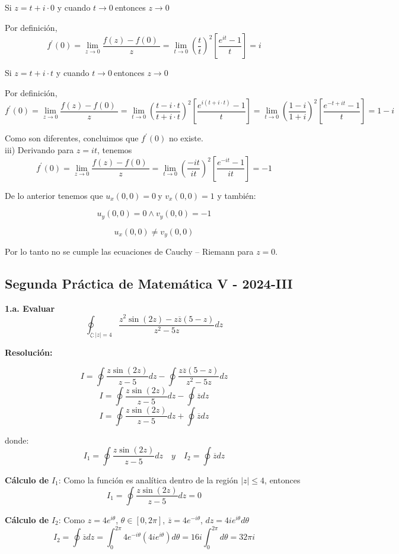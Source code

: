 \documentclass[a4paper,12pt]{article}
\begin{document}
Si $z = t + i \cdot 0$ y cuando $t \rightarrow 0\ $entonces
$z \rightarrow 0$

Por definición,
\[
f^{'}(0) = \lim_{z \rightarrow 0}\frac{f(z) - f(0)\ }{z} = \lim_{t \rightarrow 0}{\left( \frac{t}{t} \right)^{2}\left\lbrack \frac{e^{it} - 1}{t} \right\rbrack} = i
\]

Si $z = t + i \cdot t$ y cuando $t \rightarrow 0\ $entonces
$z \rightarrow 0$

Por definición,
\[
f^{'}(0) = \lim_{z \rightarrow 0}\frac{f(z) - f(0)\ }{z} = \lim_{t \rightarrow 0}{\left( \frac{t - i \cdot t}{t + i \cdot t} \right)^{2}\left\lbrack \frac{e^{i(t + i \cdot t)} - 1}{t} \right\rbrack} = \lim_{t \rightarrow 0}{\left( \frac{1 - i}{1 + i} \right)^{2}\left\lbrack \frac{e^{- t + it} - 1}{t} \right\rbrack} = 1 - i
\]

Como son diferentes, concluimos que $f^{'}(0)$ no existe.\\
iii) Derivando para $z = it$, tenemos
\[
f^{'}(0) = \lim_{z \rightarrow 0}\frac{f(z) - f(0)\ }{z} = \lim_{t \rightarrow 0}{\left( \frac{- it}{it} \right)^{2}\left\lbrack \frac{e^{- it} - 1}{it} \right\rbrack} = - 1
\]

De lo anterior tenemos que $u_{x}(0,0) = 0\ $y $v_{x}(0,0) = 1$  y  también:

\[
u_{y}(0,0) = 0  \wedge   v_{y}(0,0) = - 1
\]

\[
u_{x}(0,0) \neq v_{y}(0,0)
\]

Por lo tanto no se cumple las ecuaciones de Cauchy -- Riemann para $z = 0$.
\newpage
\subsection{Segunda Práctica de Matemática V - 2024-III}
\textbf{1.a. Evaluar}
\[
\oint_{\zeta:|z|=4} \frac{z^2 \sin(2z) - z\overline{z}(5-z)}{z^2-5z} dz
\]

\textbf{Resolución:}

\[
I = \oint \frac{z \sin(2z)}{z-5} dz - \oint \frac{z\overline{z}(5-z)}{z^2-5z} dz
\]
\[
I = \oint \frac{z \sin(2z)}{z-5} dz - \oint \overline{z} dz
\]
\[
I = \oint \frac{z \sin(2z)}{z-5} dz + \oint \overline{z} dz
\]

donde:
\[
I_1 = \oint \frac{z \sin(2z)}{z-5} dz \quad y \quad I_2 = \oint \overline{z} dz
\]

\textbf{Cálculo de} $I_1$:
Como la función es analítica dentro de la región $|z| \leq 4$,
entonces
\[
I_1 = \oint \frac{z \sin(2z)}{z-5} dz = 0
\]

\textbf{Cálculo de} $I_2$:
Como $z = 4e^{i\theta}$, $\theta \in [0, 2\pi]$, $\overline{z} = 4e^{-i\theta}$, $dz = 4ie^{i\theta} d\theta$
\[
I_2 = \oint \overline{z} dz = \int_0^{2\pi} 4e^{-i\theta} (4ie^{i\theta}) d\theta = 16i \int_0^{2\pi} d\theta = 32\pi i
\]
\end{document}
